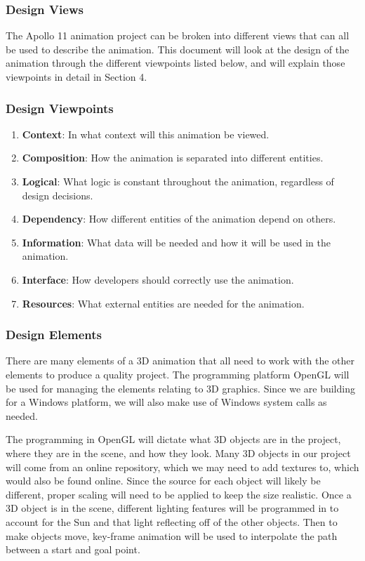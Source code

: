 \documentclass[onecolumn, draftclsnofoot,10pt, compsoc]{IEEEtran}
\begin{document}
\subsubsection{Design Views}
    The Apollo 11 animation project can be broken into different views that can all be used to describe the animation. This document will look at the design of the animation through the different viewpoints listed below, and will explain those viewpoints in detail in Section 4. 
    
    \subsubsection{Design Viewpoints}
    \begin{enumerate}
        \item \textbf{Context}: In what context will this animation be viewed.
        \item \textbf{Composition}: How the animation is separated into different entities.
        \item \textbf{Logical}: What logic is constant throughout the animation, regardless of design decisions.
        \item \textbf{Dependency}: How different entities of the animation depend on others.
        \item \textbf{Information}: What data will be needed and how it will be used in the animation. 
        \item \textbf{Interface}: How developers should correctly use the animation.
        \item \textbf{Resources}: What external entities are needed for the animation. 
    \end{enumerate}
    
    \subsubsection{Design Elements}
    There are many elements of a 3D animation that all need to work with the other elements to produce a quality project. The programming platform OpenGL will be used for managing the elements relating to 3D graphics. Since we are building for a Windows platform, we will also make use of Windows system calls as needed.
    
    The programming in OpenGL will dictate what 3D objects are in the project, where they are in the scene, and how they look. Many 3D objects in our project will come from an online repository, which we may need to add textures to, which would also be found online. Since the source for each object will likely be different, proper scaling will need to be applied to keep the size realistic. Once a 3D object is in the scene, different lighting features will be programmed in to account for the Sun and that light reflecting off of the other objects. Then to make objects move, key-frame animation will be used to interpolate the path between a start and goal point. 
\end{document}

